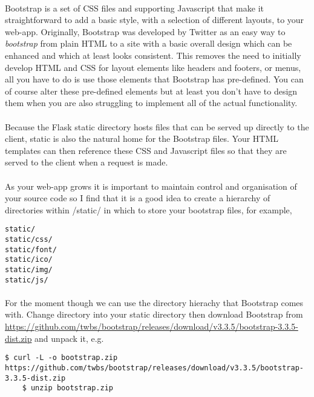\documentclass[12pt, a4paper, twoside]{book}
\begin{document}
\paragraph{} Bootstrap is a set of CSS files and supporting Javascript that make it straightforward to add a basic style, with a selection of different layouts, to your web-app. Originally, Bootstrap was developed by Twitter as an easy way to \emph{bootstrap} from plain HTML to a site with a basic overall design which can be enhanced and which at least looks consistent. This removes the need to initially develop HTML and CSS for layout elements like headers and footers, or menus, all you have to do is use those elements that Bootstrap has pre-defined. You can of course alter these pre-defined elements but at least you don't have to design them when you are also struggling to implement all of the actual functionality.

\paragraph{} Because the Flask static directory hosts files that can be served up directly to the client, static is also the natural home for the Bootstrap files. Your HTML templates can then reference these CSS and Javascript files so that they are served to the client when a request is made.

\paragraph{} As your web-app grows it is important to maintain control and organisation of your source code so I find that it is a good idea to create a hierarchy of directories within /static/ in which to store your bootstrap files, for example,

\begin{lstlisting}[style=DOS]
static/
static/css/
static/font/
static/ico/
static/img/
static/js/
\end{lstlisting}

\paragraph{} For the moment though we can use the directory hierachy that Bootstrap comes with. Change directory into your static directory  then download Bootstrap from \url{https://github.com/twbs/bootstrap/releases/download/v3.3.5/bootstrap-3.3.5-dist.zip} and unpack it, e.g.

\begin{lstlisting}[style=DOS]
    $ curl -L -o bootstrap.zip https://github.com/twbs/bootstrap/releases/download/v3.3.5/bootstrap-3.3.5-dist.zip
    $ unzip bootstrap.zip
\end{lstlisting}
\end{document}
